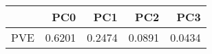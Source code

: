 \begin{tabular}{lrrrr}
\toprule
{} &    PC0 &    PC1 &    PC2 &    PC3 \\
\midrule
PVE & 0.6201 & 0.2474 & 0.0891 & 0.0434 \\
\bottomrule
\end{tabular}
